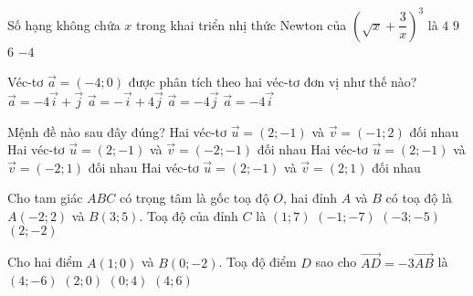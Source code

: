 \begin{ex}%
	Số hạng không chứa $x$ trong khai triển nhị thức Newton của $\left(\sqrt{x}+\dfrac{3}{x}\right)^3$ là
	\choice 
	{$4$}
	{\True$9$}
	{$6$}
	{$-4$}
\end{ex}
\begin{ex}%
	Véc-tơ $\vec{a}=(-4;0)$ được phân tích theo hai véc-tơ đơn vị như thế nào?
	\choice 
	{$\vec{a}=-4\vec{i}+\vec{j}$}
	{$\vec{a}=-\vec{i}+4\vec{j}$}
	{$\vec{a}=-4\vec{j}$}
	{\True$\vec{a}=-4\vec{i}$}
\end{ex}
\begin{ex}%
	Mệnh đề nào sau đây đúng?
	\choice 
	{Hai véc-tơ $\vec{u}=(2;-1)$ và $\vec{v}=(-1;2)$ đối nhau}
	{Hai véc-tơ $\vec{u}=(2;-1)$ và $\vec{v}=(-2;-1)$ đối nhau}
	{\True Hai véc-tơ $\vec{u}=(2;-1)$ và $\vec{v}=(-2;1)$ đối nhau}
	{Hai véc-tơ $\vec{u}=(2;-1)$ và $\vec{v}=(2;1)$ đối nhau}
\end{ex}
\begin{ex}%
	Cho tam giác $ABC$ có trọng tâm là gốc toạ độ $O$, hai đỉnh $A$ và $B$ có toạ độ là $A(-2;2)$ và $B(3;5)$. Toạ độ của đỉnh $C$ là
	\choice 
	{$(1;7)$}
	{\True$(-1;-7)$}
	{$(-3;-5)$}
	{$(2;-2)$}
\end{ex}
\begin{ex}%
	Cho hai điểm $A(1;0)$ và $B(0;-2)$. Toạ độ điểm $D$ sao cho $\vec{AD}=-3\vec{AB}$ là
	\choice 
	{$(4;-6)$}
	{$(2;0)$}
	{$(0;4)$}
	{\True$(4;6)$}
\end{ex}
